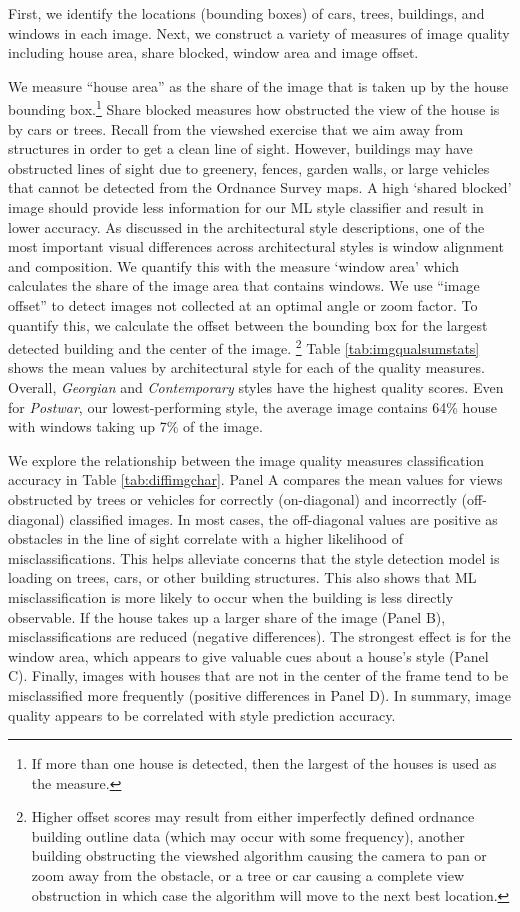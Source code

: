 \documentclass[]{article}
\begin{document}
First, we identify the locations (bounding boxes) of cars, trees, buildings, and windows in each image. Next, we construct a variety of measures of image quality including house area, share blocked, window area and image offset. 

We measure ``house area'' as the share of the image that is taken up by the house bounding box.\footnote{If more than one house is detected, then the largest of the houses is used as the measure.} Share blocked measures how obstructed the view of the house is by cars or trees. Recall from the viewshed exercise that we aim away from structures in order to get a clean line of sight. However, buildings may have obstructed lines of sight due to greenery, fences, garden walls, or large vehicles that cannot be detected from the Ordnance Survey maps. A high `shared blocked' image should provide less information for our ML style classifier and result in lower accuracy. As discussed in the architectural style descriptions, one of the most important visual differences across architectural styles is window alignment and composition. We quantify this with the measure `window area' which calculates the share of the image area that contains windows. We use ``image offset'' to detect images not collected at an optimal angle or zoom factor. To quantify this, we calculate the offset between the bounding box for the largest detected building and the center of the image.
\footnote{Higher offset scores may result from either imperfectly defined ordnance building outline data (which may occur with some frequency), another building obstructing the viewshed algorithm causing the camera to pan or zoom away from the obstacle, or a tree or car causing a complete view obstruction in which case the algorithm will move to the next best location.} Table \ref{tab:imgqualsumstats} shows the mean values by architectural style for each of the quality measures. Overall, \emph{Georgian} and \emph{Contemporary} styles have the highest quality scores. Even for \emph{Postwar}, our lowest-performing style, the average image contains 64\% house with windows taking up 7\% of the image. 

We explore the relationship between the image quality measures classification accuracy in Table \ref{tab:diffimgchar}. Panel A compares the mean values for views obstructed by trees or vehicles for correctly (on-diagonal) and incorrectly (off-diagonal) classified images. In most cases, the off-diagonal values are positive as obstacles in the line of sight correlate with a higher likelihood of misclassifications. This helps alleviate concerns that the style detection model is loading on trees, cars, or other building structures. This also shows that ML misclassification is more likely to occur when the building is less directly observable. If the house takes up a larger share of the image (Panel B), misclassifications are reduced (negative differences). The strongest effect is for the window area, which appears to give valuable cues about a house's style (Panel C). Finally, images with houses that are not in the center of the frame tend to be misclassified more frequently (positive differences in Panel D). In summary, image quality appears to be correlated with style prediction accuracy.
\end{document}
